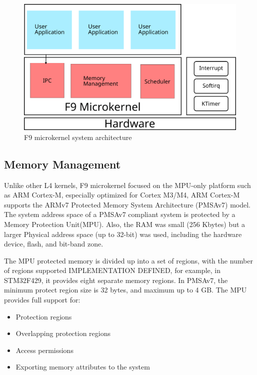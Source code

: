 \documentclass[10pt,preprint,nocopyrightspace]{sigplanconf}
\begin{document}
\begin{figure}[H]
	\begin{center}
		\includegraphics[width=\linewidth]{picture/f9_arch.png}
	\end{center}
	\caption{F9 microkernel system architecture}
	\label{fig:f9}
\end{figure}

\subsection{Memory Management}

Unlike other L4 kernels, F9 microkernel focused on the MPU-only platform such as ARM Cortex-M, especially optimized for Cortex M3/M4, ARM Cortex-M supports the ARMv7 Protected Memory System Architecture (PMSAv7) model. The system address space of a PMSAv7 compliant system is protected by a Memory Protection Unit(MPU). Also, the RAM was small (256 Kbytes) but a larger Physical address space (up to 32-bit) was used, including the hardware device, flash, and bit-band zone\cite{yiu2013definitive,st2016managing,usna2015l18}.

The MPU protected memory is divided up into a set of regions, with the number of regions supported IMPLEMENTATION DEFINED, for example, in STM32F429, it provides eight separate memory regions. In PMSAv7, the minimum protect region size is 32 bytes, and maximum up to 4 GB. The MPU provides full support for:
\begin{itemize}
	\item Protection regions
	\item Overlapping protection regions
	\item Access permissions
	\item Exporting memory attributes to the system
\end{itemize}
\end{document}
